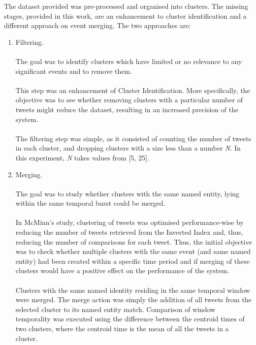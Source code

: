 \documentclass[a4paper,portrait,12pt]{article}
\begin{document}
The dataset provided was pre-processed and organised into clusters.
The missing stages, provided in this work, are an enhancement to cluster identification and a different approach on event merging.
The two approaches are:
\begin{enumerate}
	\item Filtering.\\
	      \\
	      The goal was to identify clusters which have limited or no relevance to any significant events and to remove them.\\
	      \\
	      This step was an enhancement of Cluster Identification.
	      More specifically, the objective was to see whether removing clusters with a particular number of tweets might reduce the dataset, resulting in an increased precision of the system. \\
	      \\
	      The filtering step was simple, as it consisted of counting the number of tweets in each cluster, and dropping clusters with a size less than a number \textit{N}.
	      In this experiment, \textit{N} takes values from [5, 25].
	\item Merging. \\
	      \\
	      The goal was to study whether clusters with the same named entity, lying within the same temporal burst could be merged. \\
	      \\
		  In McMinn's study, clustering of tweets was optimised performance-wise by reducing the number of tweets retrieved from the Inverted Index and, thus, reducing the number of comparisons for each tweet.
	      Thus, the initial objective was to check whether multiple clusters with the same event (and same named entity) had been created within a specific time period and if merging of these clusters would have a positive effect on the performance of the system.\\
	      \\
	      Clusters with the same named identity residing in the same temporal window were merged.
	      The merge action was simply the addition of all tweets from the selected cluster to its named entity match.
	      Comparison of window temporality was executed using the difference between the centroid times of two clusters, where the centroid time is the mean of all the tweets in a cluster.\\


\end{enumerate}
\end{document}
